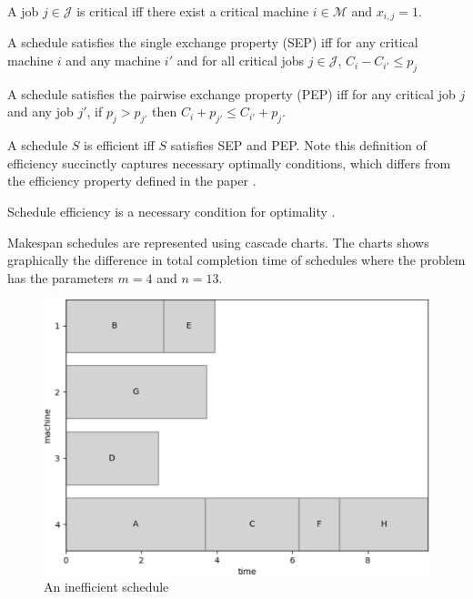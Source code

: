 \begin{definition}
	A job $j\in\mathcal{J}$ is critical iff there exist a critical machine $i\in\mathcal{M}$ and $x_{i,j}=1$.
\end{definition}

\begin{definition}
	\label{sep}
	
	A schedule satisfies the single exchange property (SEP) iff for any critical machine $i$ and any machine $i'$ and for all critical jobs $j\in\mathcal{J}$, $C_i-C_{i'}\leq p_j$
\end{definition}

\begin{definition}
	\label{pep}
	
	A schedule satisfies the pairwise exchange property (PEP) iff for any critical job $j$ and any job $j'$, if $p_j>p_{j'}$ then $C_i+p_{j'}\leq C_{i'}+p_j$.
\end{definition}

\begin{definition}
	A schedule $S$ is efficient iff $S$ satisfies SEP and PEP. Note this definition of efficiency succinctly captures necessary optimally conditions, which differs from the efficiency property defined in the paper \cite{aes}.
\end{definition}

\begin{proposition}
	Schedule efficiency is a necessary condition for optimality \cite{aes}.
\end{proposition}

Makespan schedules are represented using cascade charts. The charts shows graphically the difference in total completion time of schedules where the problem has the parameters $m=4$ and $n=13$.

\begin{figure}[H]
	\begin{center}
		\includegraphics[width=.8\linewidth]{figures/makespan_inefficient.pdf}
	\end{center}
	\caption{An inefficient schedule}
\end{figure}

